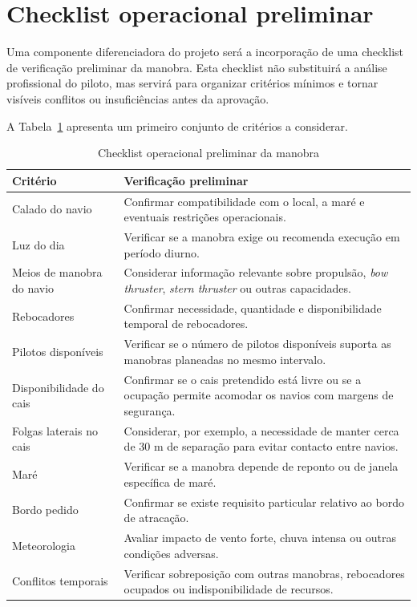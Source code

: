\documentclass[a4paper,12pt]{report}
\begin{document}
\section{Checklist operacional preliminar}

Uma componente diferenciadora do projeto será a incorporação de uma checklist de verificação preliminar da manobra. Esta checklist não substituirá a análise profissional do piloto, mas servirá para organizar critérios mínimos e tornar visíveis conflitos ou insuficiências antes da aprovação.

A Tabela~\ref{tab:checklist} apresenta um primeiro conjunto de critérios a considerar.

\begin{table}[H]
\centering
\caption{Checklist operacional preliminar da manobra}
\label{tab:checklist}
\begin{tabular}{>{\raggedright\arraybackslash}p{4.2cm} >{\raggedright\arraybackslash}p{9.8cm}}
\toprule
\textbf{Critério} & \textbf{Verificação preliminar} \\
\midrule
Calado do navio & Confirmar compatibilidade com o local, a maré e eventuais restrições operacionais. \\
Luz do dia & Verificar se a manobra exige ou recomenda execução em período diurno. \\
Meios de manobra do navio & Considerar informação relevante sobre propulsão, \textit{bow thruster}, \textit{stern thruster} ou outras capacidades. \\
Rebocadores & Confirmar necessidade, quantidade e disponibilidade temporal de rebocadores. \\
Pilotos disponíveis & Verificar se o número de pilotos disponíveis suporta as manobras planeadas no mesmo intervalo. \\
Disponibilidade do cais & Confirmar se o cais pretendido está livre ou se a ocupação permite acomodar os navios com margens de segurança. \\
Folgas laterais no cais & Considerar, por exemplo, a necessidade de manter cerca de 30 m de separação para evitar contacto entre navios. \\
Maré & Verificar se a manobra depende de reponto ou de janela específica de maré. \\
Bordo pedido & Confirmar se existe requisito particular relativo ao bordo de atracação. \\
Meteorologia & Avaliar impacto de vento forte, chuva intensa ou outras condições adversas. \\
Conflitos temporais & Verificar sobreposição com outras manobras, rebocadores ocupados ou indisponibilidade de recursos. \\
\bottomrule
\end{tabular}
\end{table}
\end{document}
